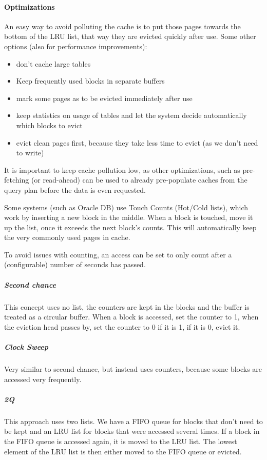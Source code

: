 \paragraph{Optimizations}
An easy way to avoid polluting the cache is to put those pages towards the bottom of the LRU list,
that way they are evicted quickly after use.
Some other options (also for performance improvements):
\begin{itemize}
    \item don't cache large tables
    \item Keep frequently used blocks in separate buffers
    \item mark some pages as to be evicted immediately after use
    \item keep statistics on usage of tables and let the system decide automatically which blocks to evict
    \item evict clean pages first, because they take less time to evict (as we don't need to write)
\end{itemize}

It is important to keep cache pollution low, as other optimizations, such as pre-fetching (or read-ahead) can be used to
already pre-populate caches from the query plan before the data is even requested.

Some systems (such as Oracle DB) use Touch Counts (Hot/Cold lists), which work by inserting a new block in the middle.
When a block is touched, move it up the list, once it exceeds the next block's counts.
This will automatically keep the very commonly used pages in cache.

To avoid issues with counting, an access can be set to only count after a (configurable) number of seconds has passed.


\subparagraph{Second chance}
This concept uses no list, the counters are kept in the blocks and the buffer is treated as a circular buffer.
When a block is accessed, set the counter to 1, when the eviction head passes by, set the counter to 0 if it is 1, if it is 0, evict it.

\subparagraph{Clock Sweep}
Very similar to second chance, but instead uses counters, because some blocks are accessed very frequently.


\subparagraph{2Q}
This approach uses two lists. We have a FIFO queue for blocks that don't need to be kept and an LRU list for blocks that were accessed several times.
If a block in the FIFO queue is accessed again, it is moved to the LRU list. The lowest element of the LRU list is then either moved to the FIFO queue or evicted.
